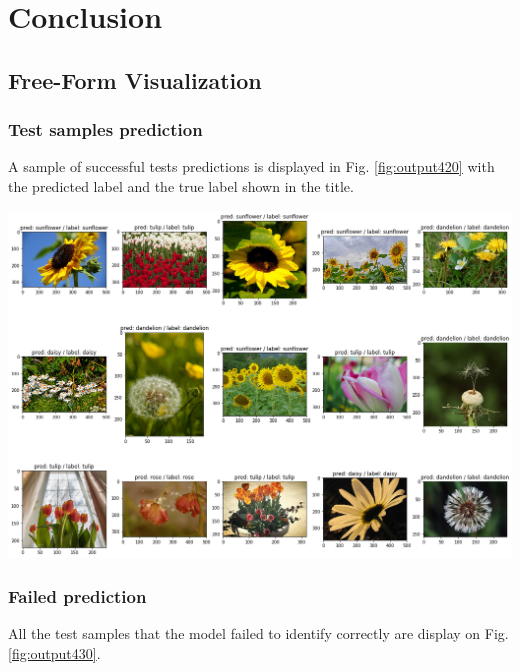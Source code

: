 \section{Conclusion}

\subsection{Free-Form Visualization}

\subsubsection{Test samples prediction}

A sample of successful tests predictions is displayed in Fig. \ref{fig:output420} with the predicted label and the true label shown in the title. 

\begin{center}
	\includegraphics[scale=.35]{sections/05_conclusion/output_42_0}
	\label{fig:output420}
\end{center}

\subsubsection{Failed  prediction}

All the test samples that the model failed to identify correctly are display on Fig. \ref{fig:output430}.

